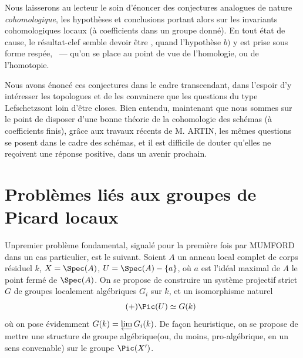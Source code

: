 Nous laisserons au lecteur le soin d'\'enoncer des conjectures analogues de nature \emph{cohomologique}, les hypoth\`eses et conclusions portant alors sur les invariants cohomologiques locaux (\`a coefficients dans un groupe donn\'e). En tout \'etat de cause, le r\'esultat-clef semble devoir \^etre , quand l'hypoth\`ese $b)$ y est prise sous forme resp\'ee, \ --- qu'on se place au point de vue de l'homologie, ou de l'homotopie.

Nous avons \'enonc\'e ces conjectures dans le cadre transcendant, dans
l'espoir d'y int\'eresser les topologues et de les convaincre que
les questions du type \og Lefschetz\fg sont loin d'\^etre closes.
Bien entendu, maintenant que nous sommes sur le point de disposer
d'une bonne th\'eorie de la cohomologie des sch\'emas (\`a coefficients
finis), gr\^ace aux travaux r\'ecents de M. ARTIN, les
m\^emes questions se posent dans le cadre des sch\'emas, et il est
difficile de douter qu'elles ne re\c coivent une r\'eponse positive,
dans un avenir prochain.

\section{Probl\`emes li\'es aux groupes de Picard locaux} \label{XIII.5}

Un\pageoriginale premier probl\`eme fondamental, signal\'e pour la premi\`ere fois par MUMFORD~\cite{XIII.5} dans un cas particulier, est le suivant. Soient $A$ un anneau local complet de corps r\'esiduel $k$, $X=\Spec(A)$, $U=\Spec(A)-\{a\}$, o\`u $a$ est l'id\'eal maximal de $A$ \ie le point ferm\'e de $\Spec(A)$. On se propose de construire un syst\`eme projectif strict $G$ de groupes localement alg\'ebriques $G_i$ sur $k$, et un isomorphisme naturel \begin{equation*} \label{eq:XIII.5.+} \tag{$+$} {\Pic(U)\simeq G(k)} \end{equation*} o\`u on pose \'evidemment $G(k)=\varprojlim G_i(k)$. De fa\c con heuristique, on se propose de \og mettre une structure de groupe alg\'ebrique\fg (ou, du moins, pro-alg\'ebrique, en un sens convenable) sur le groupe $\Pic(X')$.

